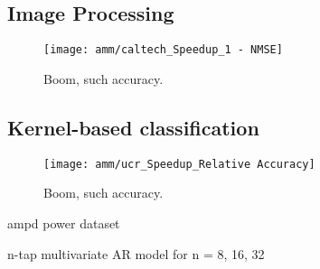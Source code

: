 \subsection{Image Processing}

\begin{figure}[h]
\begin{center}
\texttt{[image: amm/caltech\_Speedup\_1 - NMSE]}
\caption{Boom, such accuracy.}
\label{fig:caltech}
\end{center}
\end{figure}


\subsection{Kernel-based classification}

\begin{figure}[h]
\begin{center}
\texttt{[image: amm/ucr\_Speedup\_Relative Accuracy]}
\caption{Boom, such accuracy.}
\label{fig:ucr}
\end{center}
\end{figure}

ampd power dataset

n-tap multivariate AR model for n = 8, 16, 32


